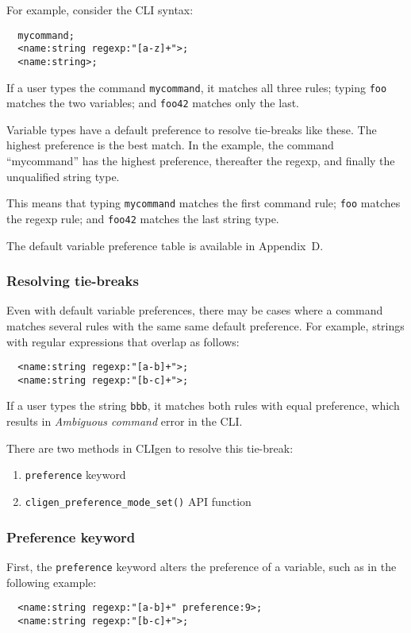 \documentclass[a4paper, 10pt] {article}
\begin{document}
For example, consider the CLI syntax:
\begin{verbatim}
  mycommand;
  <name:string regexp:"[a-z]+">;
  <name:string>;
\end{verbatim}

If a user types the command {\tt mycommand}, it matches all three rules; typing {\tt foo}
matches the two variables; and {\tt foo42} matches only the last.

Variable types have a default preference to resolve tie-breaks like
these. The highest preference is the best match. In the example, the
command ``mycommand'' has the highest preference, thereafter the
regexp, and finally the unqualified string type.

This means that typing {\tt mycommand} matches the first command rule; {\tt foo}
matches the regexp rule; and {\tt foo42} matches the last string type.

The default variable preference table is available in Appendix~D.

\subsubsection{Resolving tie-breaks}

Even with default variable preferences, there may be cases where a
command matches several rules with the same same default
preference. For example, strings with regular expressions that overlap
as follows:
\begin{verbatim}
  <name:string regexp:"[a-b]+">;
  <name:string regexp:"[b-c]+">;
\end{verbatim}
If a user types the string {\tt bbb}, it matches both rules with equal preference, which results in {\em Ambiguous command} error in the CLI.

There are two methods in CLIgen to resolve this tie-break:
\begin{enumerate}
\item {\tt preference} keyword
\item {\tt cligen\_preference\_mode\_set()} API function
\end{enumerate}

\subsubsection{Preference keyword}

First, the {\tt preference} keyword alters the preference of a variable, such as in the following example:
\begin{verbatim}
  <name:string regexp:"[a-b]+" preference:9>;
  <name:string regexp:"[b-c]+">;
\end{verbatim}
\end{document}
